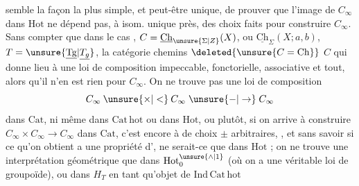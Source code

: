 semble la façon la plus simple, et peut-être unique, de prouver que l'image de $C_\infty$ dans $\mathrm{Hot}$ ne dépend pas, à isom. unique près, des choix faits pour construire $C_\infty$. Sans compter que dans le cas , $C=\underline{\mathrm{Ch}}_{\unsure{\Sigma|Z}}(X)$, ou $\underline{\mathrm{Ch}}_{\Sigma}(X;a,b)$, $T=\unsure{\underline{\mathrm{Tg}}|\underline{T_g}}$,  la catégorie  chemins $\deleted{\unsure{C=\mathrm{Ch}}}$ $C$ qui donne lieu à une  loi de composition  impeccable, fonctorielle, associative et tout, alors qu'il n'en est rien pour $C_\infty$. On ne trouve pas  une loi de composition
\[
C_\infty\mathbin{\unsure{\times|<}}C_\infty\mathrel{\unsure{-|\to}}C_\infty
\]
dans  $\mathrm{Cat}$,  ni même dans $\mathrm{Cat\,hot}$ ou dans $\mathrm{Hot}$, ou plutôt, si on arrive  à  construire  $C_\infty\times C_\infty\longrightarrow C_\infty$ dans $\mathrm{Cat}$, c'est encore  à  de choix $\pm$ arbitraires, , et sans savoir si ce qu'on obtient a une  propriété d', ne serait-ce que dans $\mathrm{Hot}$ ; on ne trouve une interprétation géométrique   que  dans $\mathrm{Hot}_0^{\unsure{\wedge|1}}$ (où on a une véritable loi de groupoïde), ou dans $H_T$ en tant qu'objet de $\mathrm{Ind\,Cat\,hot}$
